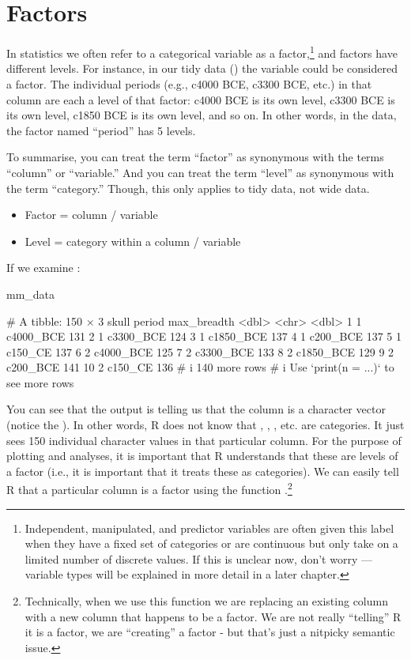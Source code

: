 \section{Factors}

In statistics we often refer to a categorical variable as a \gls{factor},\footnote{Independent, manipulated, and predictor variables are often given this label when they have a fixed set of categories or are continuous but only take on a limited number of discrete values. If this is unclear now, don't worry — variable types will be explained in more detail in a later chapter.} and factors have different \glspl{level}.  For instance, in our tidy data () the variable  could be considered a factor. The individual periods (e.g., c4000 BCE, c3300 BCE, etc.) in that column are each a level of that factor: c4000 BCE is its own level, c3300 BCE is its own level, c1850 BCE is its own level, and so on. In other words, in the  data, the factor named ``period'' has 5 levels.

To summarise, you can treat the term ``factor'' as synonymous with the terms ``column'' or ``variable.'' And you can treat the term ``level'' as synonymous with the term ``category.'' Though, this only applies to tidy data, not wide data.
{
\begin{itemize}
  \setlength\itemsep{-1em}
    \item Factor = column / variable
    \item Level = category within a column / variable
\end{itemize}
}

If we examine :

\begin{inR}
mm_data
\end{inR}
\begin{outR}
# A tibble: 150 × 3
   skull period    max_breadth
   <dbl> <chr>           <dbl>
 1     1 c4000_BCE         131
 2     1 c3300_BCE         124
 3     1 c1850_BCE         137
 4     1 c200_BCE          137
 5     1 c150_CE           137
 6     2 c4000_BCE         125
 7     2 c3300_BCE         133
 8     2 c1850_BCE         129
 9     2 c200_BCE          141
10     2 c150_CE           136
# i 140 more rows
# i Use `print(n = ...)` to see more rows
\end{outR}

\noindent
You can see that the output is telling us that the  column is a character vector (notice the ). In other words, R does not know that , , , etc. are categories. It just sees 150 individual character values in that particular column. For the purpose of plotting and analyses, it is important that R understands that these are levels of a factor (i.e., it is important that it treats these as categories). We can easily tell R that a particular column is a factor using the function .\footnote{Technically, when we use this function we are replacing an existing column with a new column that happens to be a factor. We are not really ``telling'' R it is a factor, we are ``creating'' a factor - but that's just a nitpicky semantic issue.}

